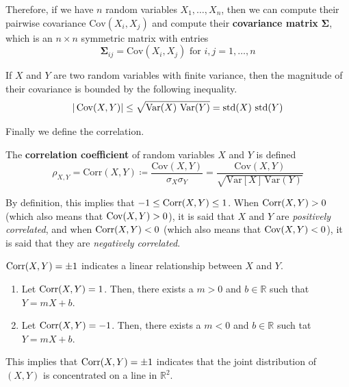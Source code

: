   Therefore, if we have $n$ random variables $X_1, \ldots, X_n$, then we can compute their pairwise covariance $\mathrm{Cov}(X_i, X_j)$ and compute their \textbf{covariance matrix} $\boldsymbol{\Sigma}$, which is an $n \times n$ symmetric matrix with entries 
  \begin{equation}
    \boldsymbol{\Sigma}_{ij} = \mathrm{Cov}(X_i, X_j) \text{ for } i, j = 1, \ldots, n
  \end{equation}

  \begin{theorem}
    If $X$ and $Y$ are two random variables with finite variance, then the magnitude of their covariance is bounded by the following inequality. 
    \begin{equation}
      |\Cov(X,Y)| \leq \sqrt{\Var(X) \, \Var(Y)} = \std(X) \, \std(Y)
    \end{equation}
  \end{theorem}

  Finally we define the correlation. 

  \begin{definition}
    The \textbf{correlation coefficient} of random variables $X$ and $Y$ is defined 
    \begin{equation}
      \rho_{X, Y} = \mathrm{Corr}(X, Y) \coloneqq \frac{\mathrm{Cov}(X, Y)}{\sigma_X \sigma_Y} = \frac{\mathrm{Cov}(X, Y)}{\sqrt{\mathrm{Var}[X] \, \mathrm{Var}(Y)}}
    \end{equation}
  \end{definition}

  By definition, this implies that $-1 \leq \Corr(X, Y) \leq 1$. When $\Corr(X, Y) > 0$ (which also means that $\Cov(X, Y) > 0$), it is said that $X$ and $Y$ are \textit{positively correlated}, and when $\Corr(X, Y) < 0$ (which also means that $\Cov(X, Y) < 0$), it is said that they are \textit{negatively correlated}. 

  \begin{theorem}
    $\Corr(X,Y) = \pm 1$ indicates a linear relationship between $X$ and $Y$. 
    \begin{enumerate}
      \item Let $\Corr(X, Y) = 1$. Then, there exists a $m>0$ and $b \in \mathbb{R}$ such that $Y = m X + b$. 
      \item Let $\Corr(X, Y) = -1$. Then, there exists a $m<0$ and $b \in \mathbb{R}$ such tat $Y = m X + b$. 
    \end{enumerate}
    This implies that $\Corr(X, Y) = \pm 1$ indicates that the joint distribution of $(X, Y)$ is concentrated on a line in $\mathbb{R}^2$. 
  \end{theorem}

